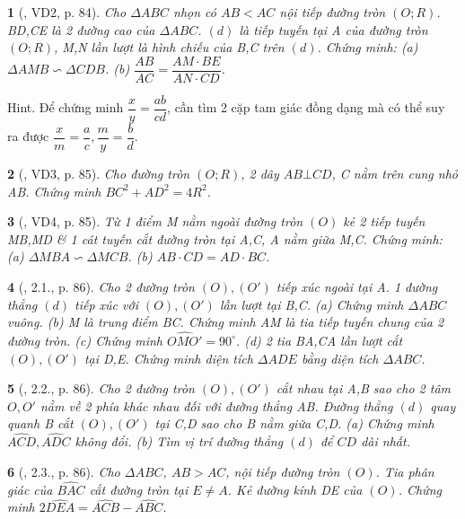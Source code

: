 \documentclass{article}
\newtheorem{baitoan}{}
\begin{document}
\begin{baitoan}[\cite{Binh_boi_duong_Toan_9_tap_2}, VD2, p. 84]
	Cho $\Delta ABC$ nhọn có $AB < AC$ nội tiếp đường tròn $(O;R)$. BD,CE là 2 đường cao của $\Delta ABC$. $(d)$ là tiếp tuyến tại A của đường tròn $(O;R)$, M,N lần lượt là hình chiếu của B,C trên $(d)$. Chứng minh: (a) $\Delta AMB\backsim\Delta CDB$. (b) $\dfrac{AB}{AC} = \dfrac{AM\cdot BE}{AN\cdot CD}$.
\end{baitoan}
{\sf Hint.} Để chứng minh $\dfrac{x}{y} = \dfrac{ab}{cd}$, cần tìm 2 cặp tam giác đồng dạng mà có thể suy ra được $\dfrac{x}{m} = \dfrac{a}{c},\dfrac{m}{y} = \dfrac{b}{d}$.

\begin{baitoan}[\cite{Binh_boi_duong_Toan_9_tap_2}, VD3, p. 85]
	Cho đường tròn $(O;R)$, 2 dây $AB\bot CD$, C nằm trên cung nhỏ AB. Chứng minh $BC^2 + AD^2 = 4R^2$.
\end{baitoan}

\begin{baitoan}[\cite{Binh_boi_duong_Toan_9_tap_2}, VD4, p. 85]
	Từ 1 điểm M nằm ngoài đường tròn $(O)$ kẻ 2 tiếp tuyến MB,MD \& 1 cát tuyến cắt đường tròn tại A,C, A nằm giữa M,C. Chứng minh: (a) $\Delta MBA\backsim\Delta MCB$. (b) $AB\cdot CD = AD\cdot BC$.
\end{baitoan}

\begin{baitoan}[\cite{Binh_boi_duong_Toan_9_tap_2}, 2.1., p. 86]
	Cho 2 đường tròn $(O),(O')$ tiếp xúc ngoài tại A. 1 đường thẳng $(d)$ tiếp xúc với $(O),(O')$ lần lượt tại B,C. (a) Chứng minh $\Delta ABC$ vuông. (b) M là trung điểm BC. Chứng minh AM là tia tiếp tuyến chung của 2 đường tròn. (c) Chứng minh $\widehat{OMO'} = 90^\circ$. (d) 2 tia BA,CA lần lượt cắt $(O),(O')$ tại D,E. Chứng minh diện tích $\Delta ADE$ bằng diện tích $\Delta ABC$.
\end{baitoan}

\begin{baitoan}[\cite{Binh_boi_duong_Toan_9_tap_2}, 2.2., p. 86]
	Cho 2 đường tròn $(O),(O')$ cắt nhau tại A,B sao cho 2 tâm $O,O'$ nằm về 2 phía khác nhau đối với đường thẳng AB. Đường thẳng $(d)$ quay quanh B cắt $(O),(O')$ tại C,D sao cho B nằm giữa C,D. (a) Chứng minh $\widehat{ACD},\widehat{ADC}$ không đổi. (b) Tìm vị trí đường thẳng $(d)$ để $CD$ dài nhất.
\end{baitoan}

\begin{baitoan}[\cite{Binh_boi_duong_Toan_9_tap_2}, 2.3., p. 86]
	Cho $\Delta ABC$, $AB > AC$, nội tiếp đường tròn $(O)$. Tia phân giác của $\widehat{BAC}$ cắt đường tròn tại $E\ne A$. Kẻ đường kính DE của $(O)$. Chứng minh $2\widehat{DEA} = \widehat{ACB} - \widehat{ABC}$.
\end{baitoan}
\end{document}
